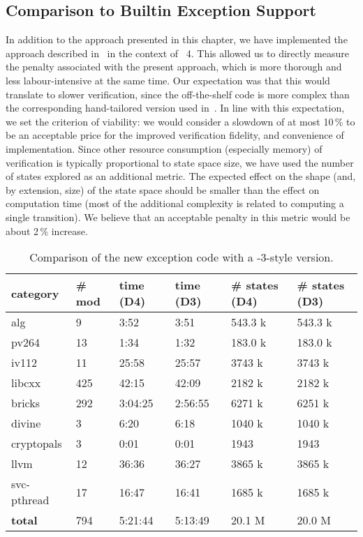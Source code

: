 \subsection{Comparison to Builtin Exception Support}\label{sec:lang:cmpD3}

In addition to the approach presented in this chapter, we have implemented
the approach described in~ in the context
of \divine{}~4. This allowed us to directly measure the penalty associated
with the present approach, which is more thorough and less
labour-intensive at the same time. Our expectation was that this would
translate to slower verification, since the off-the-shelf code is more
complex than the corresponding hand-tailored version used
in~. In line with this expectation, we set
the criterion of viability: we would consider a slowdown of at most
10\,\% to be an acceptable price for the improved verification fidelity,
and convenience of implementation. Since other resource consumption
(especially memory) of verification is typically proportional to state
space size, we have used the number of states explored as an additional
metric. The expected effect on the shape (and, by extension, size) of
the state space should be smaller than the effect on computation time
(most of the additional complexity is related to computing a single
transition). We believe that an acceptable penalty in this metric would
be about 2\,\% increase.

\begin{table}[tp]
\caption{\label{tbl:D4D3}Comparison of the new exception code with a
\divine{}-3-style version. }
\begin{tabularx}{\textwidth}{llLLLL}
\toprule
category & \# mod & time (D4) & time (D3) & \# states (D4) & \# states
(D3)\\
\midrule
alg & 9 & 3:52 & 3:51 & 543.3 k & 543.3 k\\
pv264 & 13 & 1:34 & 1:32 & 183.0 k & 183.0 k\\
iv112 & 11 & 25:58 & 25:57 & 3743 k & 3743 k\\
libcxx & 425 & 42:15 & 42:09 & 2182 k & 2182 k\\
bricks & 292 & 3:04:25 & 2:56:55 & 6271 k & 6251 k\\
divine & 3 & 6:20 & 6:18 & 1040 k & 1040 k\\
cryptopals & 3 & 0:01 & 0:01 & 1943 & 1943\\
llvm & 12 & 36:36 & 36:27 & 3865 k & 3865 k\\
svc-pthread & 17 & 16:47 & 16:41 & 1685 k & 1685 k\\
\textbf{total} & 794 & 5:21:44 & 5:13:49 & 20.1 M & 20.0 M\\
\bottomrule
\end{tabularx}
\end{table}

